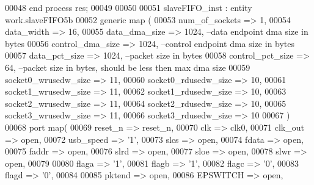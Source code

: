 \begin{DoxyCode}
00048     \textcolor{keywordflow}{end} \textcolor{keywordflow}{process} \textcolor{vhdlchar}{res};
00049     
00050 
00051   slaveFIFO\_inst : \textcolor{keywordflow}{entity} work.slaveFIFO5b 
00052 \textcolor{keywordflow}{generic} \textcolor{keywordflow}{map} (
00053     num_of_sockets      => \textcolor{vhdllogic}{1},
00054     data_width              => \textcolor{vhdllogic}{16},
00055     data_dma_size           => \textcolor{vhdllogic}{1024},\textcolor{keyword}{                            --data endpoint dma size in bytes}
00056     control_dma_size        => \textcolor{vhdllogic}{1024},\textcolor{keyword}{                            --control endpoint dma size in bytes}
00057     data_pct_size           => \textcolor{vhdllogic}{1024},\textcolor{keyword}{                            --packet size in bytes}
00058     control_pct_size        => \textcolor{vhdllogic}{64},\textcolor{keyword}{                              --packet size in bytes, should be less then
       max dma size}
00059     socket0_wrusedw_size => \textcolor{vhdllogic}{11},
00060     socket0_rdusedw_size    => \textcolor{vhdllogic}{10},
00061     socket1_wrusedw_size => \textcolor{vhdllogic}{11},
00062     socket1_rdusedw_size    => \textcolor{vhdllogic}{10},
00063     socket2_wrusedw_size => \textcolor{vhdllogic}{11},
00064     socket2_rdusedw_size    => \textcolor{vhdllogic}{10},
00065     socket3_wrusedw_size => \textcolor{vhdllogic}{11},
00066     socket3_rdusedw_size    => \textcolor{vhdllogic}{10}
00067 \textcolor{vhdlchar}{)}
00068 \textcolor{keywordflow}{port} \textcolor{keywordflow}{map}(
00069         reset_n                     => reset_n,
00070         clk                 => clk0, 
00071         clk_out             => \textcolor{keywordflow}{open},
00072         usb_speed               => '1', 
00073         slcs                    => \textcolor{keywordflow}{open},
00074         fdata                   => \textcolor{keywordflow}{open},        
00075         faddr                   => \textcolor{keywordflow}{open},
00076         slrd                    => \textcolor{keywordflow}{open},
00077         sloe                    => \textcolor{keywordflow}{open},
00078         slwr                    => \textcolor{keywordflow}{open},
00079                     
00080       flaga                 => '1',                               
00081         flagb                   => '1',
00082       flagc                 => '0',
00083       flagd                 => '0',
00084 
00085         pktend              => \textcolor{keywordflow}{open},
00086         EPSWITCH                    => \textcolor{keywordflow}{open},

\end{DoxyCode}
